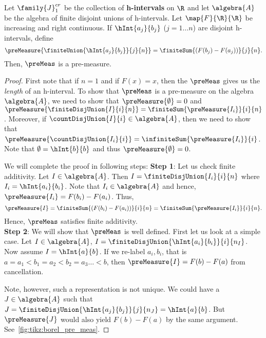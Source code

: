 \begin{Proposition}[name=Pre-measure on collection of
    \textbf{h-intervals}]\label{prop:pre_meas_hint}
    Let $\family{J}^{cr}_{1}$ be the collection of \textbf{h-intervals} on $\R$ and let
    $\algebra{A}$ be the algebra of finite disjoint unions of h-intervals. Let
    $\map{F}{\R}{\R}$ be increasing and right continuous. If $\hInt{a_j}{b_j}$ ($j = 1\dots n$) 
    are disjoint h-intervals, define 
    \[\preMeasure{\finiteUnion{\hInt{a_j}{b_j}}{j}{n}} = \finiteSum{(F(b_j)-F(a_j))}{j}{n}.\] 
    Then, $\preMeas$ is a pre-measure.
\end{Proposition}
\begin{proof}
    First note that if $n=1$ and if $F(x) = x$, then the $\preMeas$ gives us the \emph{length} of
    an h-interval. To show that $\preMeas$ is a pre-measure on the algebra $\algebra{A}$, we need to
    show that $\preMeasure{\emptyset} = 0$ and $\preMeasure{\finiteDisjUnion{I}{i}{n}} =
    \finiteSum{\preMeasure{I_i}}{i}{n}$. Moreover, if $\countDisjUnion{I}{i} \in \algebra{A}$, then we need to
    show that $\preMeasure{\countDisjUnion{I_i}{i}} = \infiniteSum{\preMeasure{I_i}}{i}$. Note that
    $\emptyset = \hInt{b}{b}$ and thus $\preMeasure{\emptyset} = 0$. 


    We will complete the proof in following steps:
    \newline
    \textbf{Step 1}: Let us check finite additivity.
    Let $I \in \algebra{A}$. Then $I = \finiteDisjUnion{I_i}{i}{n}$ where $I_i = \hInt{a_i}{b_i}$. Note
    that $I_i \in \algebra{A}$ and hence, $\preMeasure{I_i} = F(b_i) - F(a_i)$. Thus,
    \[\preMeasure{I} = \finiteSum{(F(b_i)-F(a_i))}{i}{n} 
	= \finiteSum{\preMeasure{I_i}}{i}{n}.\]
    Hence, $\preMeas$ satisfies finite additivity.
    \\
    \textbf{Step 2}: We will show that $\preMeas$ is well defined.
    First let us look at a simple case. Let $I \in \algebra{A}$, 
    $I = \finiteDisjUnion{\hInt{a_i}{b_i}}{i}{n_I}$. Now assume $I = \hInt{a}{b}$. 
    If we re-label $a_i,b_i$, that is $a=a_1 < b_1 = a_2 < b_2 = a_3 \dots < b$,
    then $\preMeasure{I} = F(b) - F(a)$ from cancellation. 
    
    Note, however, such a representation is not unique. We could have a $J\in \algebra{A}$ such that
    $J = \finiteDisjUnion{\hInt{a_j}{b_j}}{j}{n_J} = \hInt{a}{b}$. But $\preMeasure{J}$
    would also yield $F(b) - F(a)$ by the same argument. See~\ref{fig:tikz:borel_pre_meas}. 


\end{proof}
